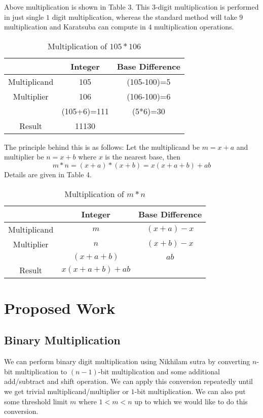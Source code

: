 \documentclass[conference]{IEEEtran}
\begin{document}
Above multiplication is shown in Table 3. This $3$-digit multiplication is performed in just single $1$ digit multiplication, whereas the standard method will take $9$ multiplication and Karatsuba can compute in $4$ multiplication operations.

\begin{table}[ht]
\renewcommand{\arraystretch}{1.3}
\caption{Multiplication of $105*106$}
\label{table 3}
\begin{center}
\begin{tabular}{|c| c| c| } 
\hline
 & Integer & Base Difference    \\ [1ex] \hline\hline 
Multiplicand & 105 & (105-100)=5   \\ \hline
Multiplier & 106 & (106-100)=6  \\ \hline
 & (105+6)=111 & (5*6)=30  \\ \hline
Result & 11130 &   \\ [1ex] \hline

\end{tabular} 
\end{center}
\end{table} 

The principle behind this is as follows: 
Let the multiplicand be $m=x+a$ and multiplier be $n=x+b$ where $x$ is the nearest base, then 
$$ m*n=(x+a)*(x+b)=x(x+a+b)+ab $$
Details are given in Table 4.

\begin{table}[ht]
\renewcommand{\arraystretch}{1.3}
\caption{Multiplication of $m*n$}
\label{table 4}
\begin{center}
\begin{tabular}{|c| c| c| } 
\hline
 & Integer & Base Difference    \\ [1ex] \hline\hline 
Multiplicand & $m$ & $(x+a)-x$   \\ \hline
Multiplier & $n$ & $(x+b)-x$  \\ \hline
 & $(x+a+b)$ & $ab$  \\ \hline
Result & $x(x+a+b)+ab$ &   \\ [1ex] \hline

\end{tabular} 
\end{center}
\end{table} 


\section{Proposed Work}
\subsection{Binary Multiplication}
We can perform binary digit multiplication using Nikhilam sutra by converting $n$-bit multiplication to $(n-1)$-bit multiplication and some additional add/subtract and shift operation. We can apply this conversion repeatedly until we get trivial multiplicand/multiplier or $1$-bit multiplication. We can also put some threshold limit $m$ where $1<m<n$ up to which we would like to do this conversion.\\
\end{document}
